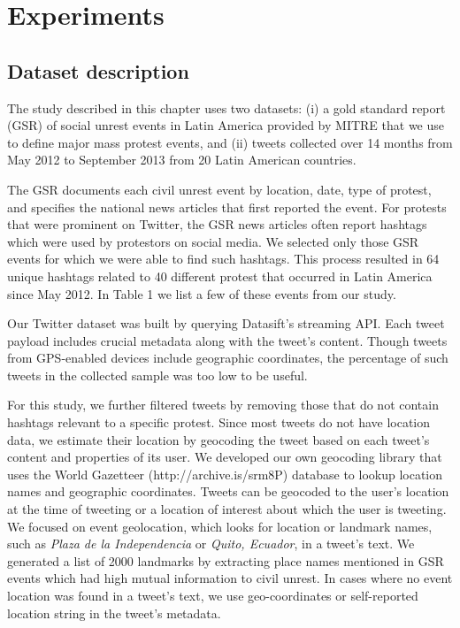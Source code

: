 
\section{Experiments}
\subsection{Dataset description}

The study described in this chapter uses two datasets: (i)
a gold standard report (GSR) of social unrest events in Latin America
provided by MITRE that we use to define
major mass protest events, and (ii)
tweets collected over 14 months from May 2012 to September 2013 from 20
Latin American countries.

The GSR documents each civil unrest event by location, date, type
of protest, and specifies the national news articles that
first reported the event. For protests that were prominent on Twitter, the
GSR news articles often report hashtags which were used by protestors
on social media. We selected only those GSR events for which we
were able to find such hashtags. This process resulted in 64
unique hashtags related to 40 different protest that occurred
in Latin America since May 2012. In Table 1 we list a few of
these events from our study.

Our Twitter dataset was built by querying Datasift's streaming API. Each tweet payload includes crucial metadata along with the tweet's content. Though tweets from GPS-enabled devices include geographic coordinates, the percentage of such tweets in the collected sample was too low to be useful.

For this study, we further filtered tweets by removing those that do not contain hashtags relevant to a specific protest. Since most tweets do not have location data, we estimate their location by geocoding the tweet based on each tweet's content and properties of its user. We developed our own geocoding library that uses the World Gazetteer (http://archive.is/srm8P) database to lookup location names and geographic coordinates. Tweets can be geocoded to the user's location at the time of tweeting or a location of interest about which the user is tweeting. We focused on event geolocation, which looks for location or landmark names, such as \textit{Plaza de la Independencia} or \textit{Quito, Ecuador}, in a tweet's text.  We generated a list of 2000 landmarks by extracting place names mentioned in GSR events which had high mutual information to civil unrest. In cases where no event location was found in a tweet's text, we use geo-coordinates or self-reported location string in the tweet's metadata.

